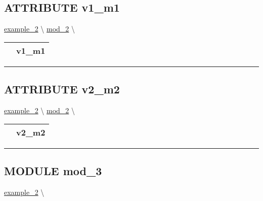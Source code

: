\subsection*{\textsf{\colorbox{headtoc}{\color{white} ATTRIBUTE}
v1\_m1}}

\hypertarget{ecldoc:intest.inintest.example_2.mod_2.v1_m1}{}
\hspace{0pt} \hyperlink{ecldoc:intest.inintest.example_2}{example_2} \textbackslash 
\hspace{0pt} \hyperlink{ecldoc:intest.inintest.example_2.mod_2}{mod_2} \textbackslash 

{\renewcommand{\arraystretch}{1.5}
\begin{tabularx}{\textwidth}{|>{\raggedright\arraybackslash}l|X|}
\hline
\hspace{0pt}\mytexttt{\color{red} } & \textbf{v1\_m1} \\
\hline
\end{tabularx}
}

\par


\rule{\linewidth}{0.5pt}
\subsection*{\textsf{\colorbox{headtoc}{\color{white} ATTRIBUTE}
v2\_m2}}

\hypertarget{ecldoc:intest.inintest.example_2.mod_2.v2_m2}{}
\hspace{0pt} \hyperlink{ecldoc:intest.inintest.example_2}{example_2} \textbackslash 
\hspace{0pt} \hyperlink{ecldoc:intest.inintest.example_2.mod_2}{mod_2} \textbackslash 

{\renewcommand{\arraystretch}{1.5}
\begin{tabularx}{\textwidth}{|>{\raggedright\arraybackslash}l|X|}
\hline
\hspace{0pt}\mytexttt{\color{red} } & \textbf{v2\_m2} \\
\hline
\end{tabularx}
}

\par


\rule{\linewidth}{0.5pt}


\subsection*{\textsf{\colorbox{headtoc}{\color{white} MODULE}
mod\_3}}

\hypertarget{ecldoc:intest.inintest.example_2.mod_3}{}
\hspace{0pt} \hyperlink{ecldoc:intest.inintest.example_2}{example_2} \textbackslash 

